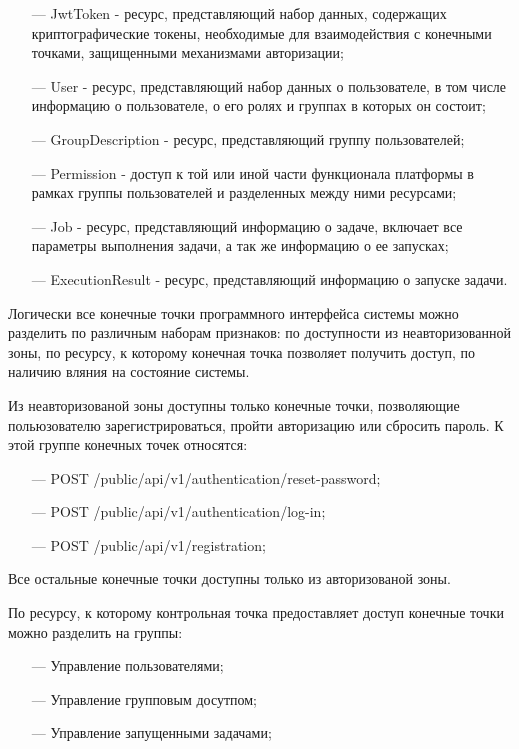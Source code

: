 \begin{itemize}
  \item[---] JwtToken - ресурс, представляющий набор данных, содержащих криптографические токены, необходимые для взаимодействия с конечными точками, защищенными механизмами авторизации;
  \item[---] User - ресурс, представляющий набор данных о пользователе, в том числе информацию о пользователе, о его ролях и группах в которых он состоит;
  \item[---] GroupDescription - ресурс, представляющий группу пользователей;
  \item[---] Permission - доступ к той или иной части функционала платформы в рамках группы пользователей и разделенных между ними ресурсами; 
  \item[---] Job - ресурс, представляющий информацию о задаче, включает все параметры выполнения задачи, а так же информацию о ее запусках;
  \item[---] ExecutionResult - ресурс, представляющий информацию о запуске задачи. 
\end{itemize}

Логически все конечные точки программного интерфейса системы можно разделить по различным наборам признаков: по доступности из неавторизованной зоны, по ресурсу, к которому конечная точка позволяет получить доступ, по наличию вляния на состояние системы.

Из неавторизованой зоны доступны только конечные точки, позволяющие польюзователю зарегистрироваться, пройти авторизацию или сбросить пароль.
К этой группе конечных точек относятся:

\begin{itemize}
  \item[---] POST /public/api/v1/authentication/reset-password;
  \item[---] POST /public/api/v1/authentication/log-in;
  \item[---] POST /public/api/v1/registration;
\end{itemize}

Все остальные конечные точки доступны только из авторизованой зоны.

По ресурсу, к которому контрольная точка предоставляет доступ конечные точки можно разделить на группы:

\begin{itemize}
  \item[---] Управление пользователями;
  \item[---] Управление групповым досутпом;
  \item[---] Управление запущенными задачами;
\end{itemize}


